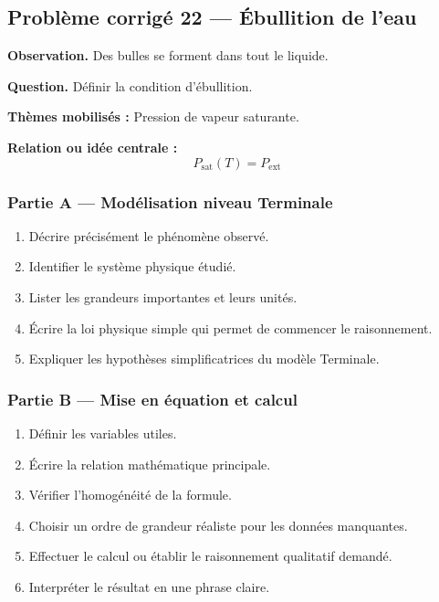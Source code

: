 \documentclass[11pt,a4paper]{article}
\begin{document}
\subsection{Problème corrigé 22 — Ébullition de l'eau}

\begin{exercicebox}
\textbf{Observation.} Des bulles se forment dans tout le liquide.

\medskip
\textbf{Question.} Définir la condition d'ébullition.

\medskip
\textbf{Thèmes mobilisés :} Pression de vapeur saturante.

\medskip
\textbf{Relation ou idée centrale :}
\[
P_{\mathrm{sat}}(T)=P_{\mathrm{ext}}
\]
\end{exercicebox}

\subsubsection*{Partie A — Modélisation niveau Terminale}

\begin{enumerate}
  \item Décrire précisément le phénomène observé.
  \item Identifier le système physique étudié.
  \item Lister les grandeurs importantes et leurs unités.
  \item Écrire la loi physique simple qui permet de commencer le raisonnement.
  \item Expliquer les hypothèses simplificatrices du modèle Terminale.
\end{enumerate}

\subsubsection*{Partie B — Mise en équation et calcul}

\begin{enumerate}
  \item Définir les variables utiles.
  \item Écrire la relation mathématique principale.
  \item Vérifier l'homogénéité de la formule.
  \item Choisir un ordre de grandeur réaliste pour les données manquantes.
  \item Effectuer le calcul ou établir le raisonnement qualitatif demandé.
  \item Interpréter le résultat en une phrase claire.
\end{enumerate}
\end{document}
